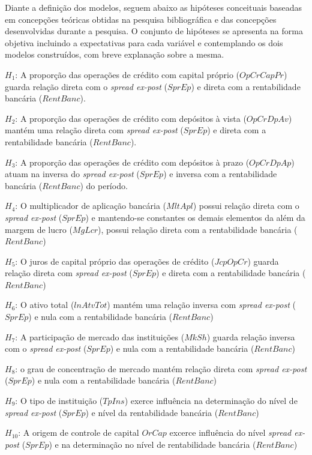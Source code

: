 \documentclass[12pt,openright,oneside,a4paper,chapter=TITLE,section=TITLE,subsection=TITLE,english,french,spanish,portugues,sumario=tradicional]{abntex2}
\begin{document}
Diante a definição dos modelos, seguem abaixo as hipóteses conceituais baseadas em concepções teóricas obtidas na pesquisa bibliográfica e das concepções desenvolvidas durante a pesquisa. O conjunto de hipóteses se apresenta na forma objetiva incluindo a expectativas para cada variável e contemplando os dois modelos construídos, com breve explanação sobre a mesma.

\(H_1\): A proporção das operações de crédito com capital próprio (\(OpCrCapPr\)) guarda relação direta com o \emph{spread ex-post} (\(SprEp\)) e direta com a rentabilidade bancária (\(RentBanc\)).

\(H_2\): A proporção das operações de crédito com depósitos à vista (\(OpCrDpAv\)) mantém uma relação direta com \emph{spread ex-post} (\(SprEp\)) e direta com a rentabilidade bancária (\(RentBanc\)).

\(H_3\): A proporção das operações de crédito com depósitos à prazo (\(OpCrDpAp\)) atuam na inversa do \emph{spread ex-post} (\(SprEp\)) e inversa com a rentabilidade bancária (\(RentBanc\)) do período.

\(H_4\): O multiplicador de aplicação bancária (\(MltApl\)) possui relação direta com o \emph{spread ex-post} (\(SprEp\)) e mantendo-se constantes os demais elementos da além da margem de lucro (\(MgLcr\)), possui relação direta com a rentabilidade bancária (\(RentBanc\))

\(H_5\): O juros de capital próprio das operações de crédito (\(JcpOpCr\)) guarda relação direta com \emph{spread ex-post} (\(SprEp\)) e direta com a rentabilidade bancária (\(RentBanc\))

\(H_6\): O ativo total (\(lnAtvTot\)) mantém uma relação inversa com \emph{spread ex-post} (\(SprEp\)) e nula com a rentabilidade bancária (\(RentBanc\))

\(H_7\): A participação de mercado das instituições (\(MkSh\)) guarda relação inversa com o \emph{spread ex-post} (\(SprEp\)) e nula com a rentabilidade bancária (\(RentBanc\))

\(H_8\): o grau de concentração de mercado mantém relação direta com \emph{spread ex-post} (\(SprEp\)) e nula com a rentabilidade bancária (\(RentBanc\))

\(H_9\): O tipo de instituição (\(TpIns\)) exerce influência na determinação do nível de \emph{spread ex-post} (\(SprEp\)) e nível da rentabilidade bancária (\(RentBanc\))

\(H_10\): A origem de controle de capital \(OrCap\) excerce influência
do nível \emph{spread ex-post} (\(SprEp\)) e na determinação no nível de rentabilidade bancária (\(RentBanc\))
\end{document}
